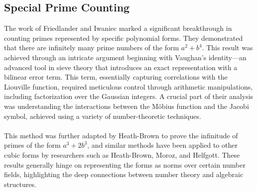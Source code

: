 \subsection{Special Prime Counting}
The work of Friedlander and Iwaniec marked a significant breakthrough in counting primes represented by specific polynomial forms. They demonstrated that there are infinitely many prime numbers of the form $a^2 + b^4$. 
This result was achieved through an intricate argument beginning with Vaughan’s identity—an advanced tool in sieve theory that introduces an exact representation with a bilinear error term. This term, essentially capturing correlations with the Liouville function, required meticulous control through arithmetic manipulations, including factorization over the Gaussian integers. A crucial part of their analysis was understanding the interactions between the Möbius function and the Jacobi symbol, achieved using a variety of number-theoretic techniques.\\
\\
This method was further adapted by Heath-Brown to prove the infinitude of primes of the form $a^3 + 2b^3$, and similar methods have been applied to other cubic forms by researchers such as Heath-Brown, Moroz, and Helfgott. These results generally hinge on representing the forms as norms over certain number fields, highlighting the deep connections between number theory and algebraic structures.



